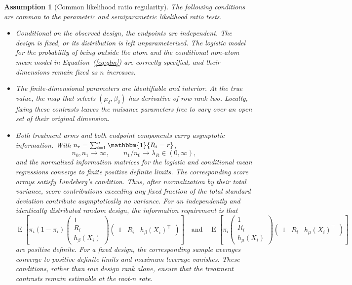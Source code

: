 \documentclass[11pt]{article}
\DeclareMathOperator{\E}{E}
\newtheorem{assumption}{Assumption}
\begin{document}
\begin{assumption}[Common likelihood ratio regularity]\label{ass:common-lrt}
The following conditions are common to the parametric and semiparametric likelihood ratio tests.
\begin{itemize}
  \item Conditional on the observed design, the endpoints are independent. The design is fixed, or its distribution is left unparameterized. The logistic model for the probability of being outside the atom and the conditional non-atom mean model in Equation~(\ref{eq:glm}) are correctly specified, and their dimensions remain fixed as $n$ increases.
  \item The finite-dimensional parameters are identifiable and interior. At the true value, the map that selects $(\mu_\delta,\beta_\delta)$ has derivative of row rank two. Locally, fixing these contrasts leaves the nuisance parameters free to vary over an open set of their original dimension.
  \item Both treatment arms and both endpoint components carry asymptotic information. With $n_r=\sum_{i=1}^n\mathbbm{1}\{R_i=r\}$,
  \[
    n_0,n_1\to\infty,
    \qquad
    n_1/n_0\to\lambda_R\in(0,\infty),
  \]
  and the normalized information matrices for the logistic and conditional mean regressions converge to finite positive definite limits. The corresponding score arrays satisfy Lindeberg's condition. Thus, after normalization by their total variance, score contributions exceeding any fixed fraction of the total standard deviation contribute asymptotically no variance. For an independently and identically distributed random design, the information requirement is that
  \[
    \E\!\left[\pi_i(1-\pi_i)
      \begin{pmatrix}1\\R_i\\h_\beta(X_i)\end{pmatrix}
      \begin{pmatrix}1&R_i&h_\beta(X_i)^\top\end{pmatrix}\right]
    \quad\text{and}\quad
    \E\!\left[\pi_i
      \begin{pmatrix}1\\R_i\\h_\mu(X_i)\end{pmatrix}
      \begin{pmatrix}1&R_i&h_\mu(X_i)^\top\end{pmatrix}\right]
  \]
  are positive definite. For a fixed design, the corresponding sample averages converge to positive definite limits and maximum leverage vanishes. These conditions, rather than raw design rank alone, ensure that the treatment contrasts remain estimable at the root-$n$ rate.
\end{itemize}
\end{assumption}
\end{document}
